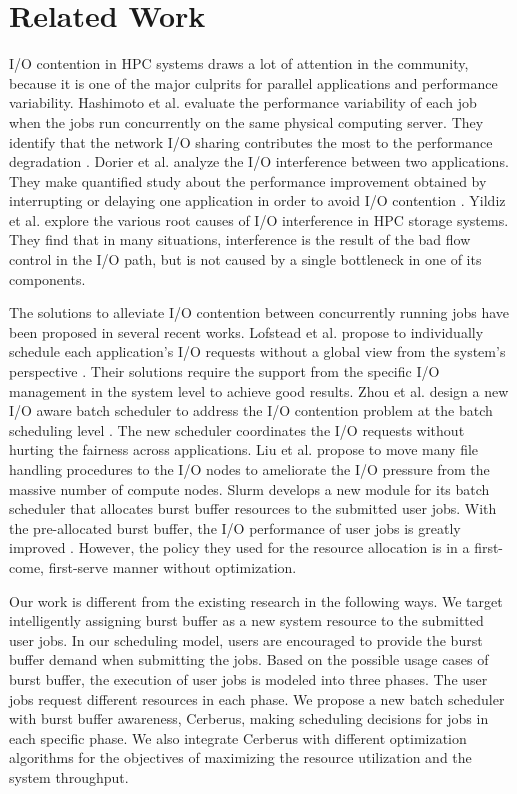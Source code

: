 \section{Related Work}
\label{Sec:RelatedWorks}

I/O contention in HPC systems draws a lot of attention in the community,
because it is one of the major culprits for parallel applications and performance variability.
Hashimoto et al. evaluate the performance variability of each job
when the jobs run concurrently on the same physical computing server.
They identify that the network I/O sharing contributes the most to
the performance degradation \cite{hashimoto:ICNC:2012}.
Dorier et al. analyze the I/O interference between two applications.
They make quantified study about the performance improvement obtained
by interrupting or delaying one application in order to avoid I/O contention \cite{dorier:IPDPS:2014}.
Yildiz et al. \cite{yildiz:IPDPS:2016} explore the various root causes
of I/O interference in HPC storage systems.
They find that in many situations, interference is the result of the bad flow control in the I/O path,
but is not caused by a single bottleneck in one of its components.

The solutions to alleviate I/O contention between concurrently
running jobs have been proposed in several recent works.
Lofstead et al. propose to individually schedule each application's I/O requests without
a global view from the system's perspective \cite{lofstead:sc:2010}.
Their solutions require the support from the specific I/O management
in the system level to achieve good results.
Zhou et al. design a new I/O aware batch scheduler to address the I/O
contention problem at the batch scheduling level \cite{zhou:Cluster:2015}.
The new scheduler coordinates the  I/O requests without hurting the fairness across applications.
Liu et al. propose to move many file handling procedures to the I/O nodes to
ameliorate the I/O pressure from the massive number of compute nodes\cite{Liu:MSST:2012}.
Slurm develops a new module for its batch scheduler that allocates burst buffer
resources to the submitted user jobs. With the pre-allocated burst buffer,
the I/O performance of user jobs is greatly improved \cite{SlurmBBGuide}.
However, the policy they used for the resource allocation is in a first-come, first-serve manner without optimization.

Our work is different from the existing research in the following ways.
We target intelligently assigning burst buffer as a new system resource to the submitted user jobs.
In our scheduling model, users are encouraged to provide the burst buffer demand when submitting the jobs.
Based on the possible usage cases of burst buffer, the execution of user jobs is modeled into three phases.
The user jobs request different resources in each phase.
We propose a new batch scheduler with burst buffer awareness, Cerberus,
making scheduling decisions for jobs in each specific phase.
We also integrate Cerberus with different optimization algorithms for the
objectives of maximizing the resource utilization and the system throughput.




